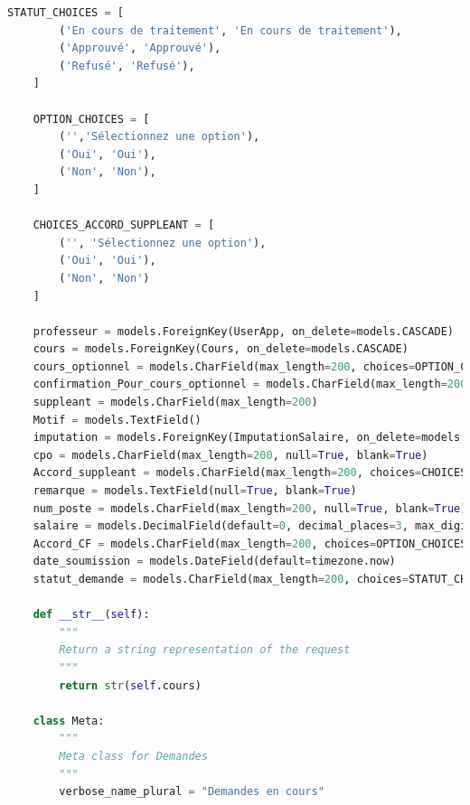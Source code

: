 \documentclass[12pt]{article}
\begin{document}
\begin{lstlisting}[language=Python]
    STATUT_CHOICES = [
        ('En cours de traitement', 'En cours de traitement'),
        ('Approuvé', 'Approuvé'),
        ('Refusé', 'Refusé'),
    ]

    OPTION_CHOICES = [
        ('','Sélectionnez une option'),
        ('Oui', 'Oui'),
        ('Non', 'Non'),
    ]

    CHOICES_ACCORD_SUPPLEANT = [
        ('', 'Sélectionnez une option'),
        ('Oui', 'Oui'),
        ('Non', 'Non')
    ]

    professeur = models.ForeignKey(UserApp, on_delete=models.CASCADE)
    cours = models.ForeignKey(Cours, on_delete=models.CASCADE)
    cours_optionnel = models.CharField(max_length=200, choices=OPTION_CHOICES, default='Sélectionnez une option')
    confirmation_Pour_cours_optionnel = models.CharField(max_length=200, choices=OPTION_CHOICES, default='Sélectionnez une option')
    suppleant = models.CharField(max_length=200)
    Motif = models.TextField()
    imputation = models.ForeignKey(ImputationSalaire, on_delete=models.CASCADE)
    cpo = models.CharField(max_length=200, null=True, blank=True)
    Accord_suppleant = models.CharField(max_length=200, choices=CHOICES_ACCORD_SUPPLEANT, default='Sélectionnez une option')
    remarque = models.TextField(null=True, blank=True)
    num_poste = models.CharField(max_length=200, null=True, blank=True)
    salaire = models.DecimalField(default=0, decimal_places=3, max_digits=100, null=True, blank=True)
    Accord_CF = models.CharField(max_length=200, choices=OPTION_CHOICES, default='Sélectionnez une option')
    date_soumission = models.DateField(default=timezone.now)
    statut_demande = models.CharField(max_length=200, choices=STATUT_CHOICES, default='En cours de traitement')

    def __str__(self):
        """
        Return a string representation of the request
        """
        return str(self.cours)
    
    class Meta:
        """
        Meta class for Demandes
        """
        verbose_name_plural = "Demandes en cours"
\end{lstlisting}
\end{document}
